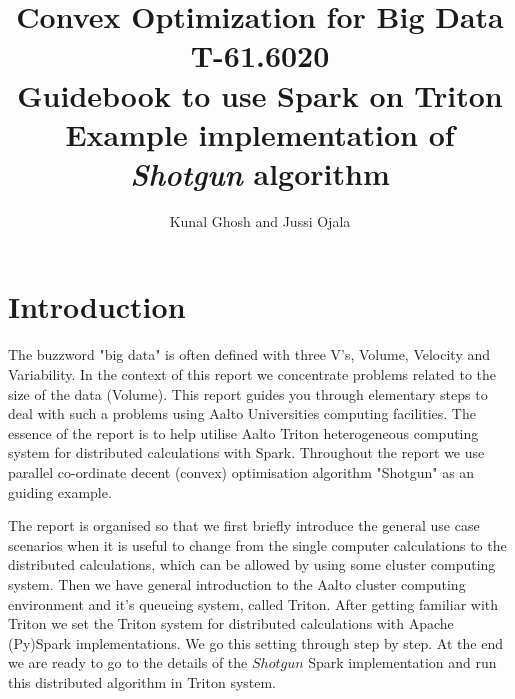 \documentclass[a4paper,11pt]{article}
\begin{document}
\title{Convex Optimization for Big Data T-61.6020 \\ \vspace{8 mm}
	Guidebook to use Spark on Triton \\
	\large{  Example implementation of \textit{Shotgun} algorithm }}

    \date{}
\author{Kunal Ghosh and Jussi Ojala } %
\maketitle
\tableofcontents

\newpage

\section{Introduction}\label{prob1}

The buzzword "big data" is often defined with three V's, Volume, Velocity and Variability. In the context of this report we concentrate problems related to the size of the data (Volume). This report guides you through elementary steps to deal with such a problems using Aalto Universities  computing facilities. The essence of the report is to help utilise Aalto Triton heterogeneous computing system for distributed calculations with Spark. Throughout the report we use parallel co-ordinate decent (convex) optimisation algorithm "Shotgun" as an guiding example. 

The report is organised so that we first briefly introduce the general use case scenarios when it is useful to change from the single computer calculations to the distributed calculations, which can be allowed by using some cluster computing system. Then we have general introduction to the Aalto cluster computing environment and it's queueing system, called Triton. After getting familiar with Triton we set the Triton system for distributed calculations with Apache (Py)Spark implementations. We go this setting through step by step. At the end we are ready to go to the details of the $Shotgun$ Spark implementation and run this distributed algorithm in Triton system.        
\end{document}
